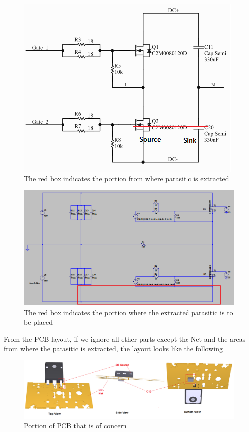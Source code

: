 \begin{figure} [H]
  \centering
  \includegraphics[width=\linewidth]{pictures/examples/schematic2.png}
  \caption{The red box indicates the portion from where parasitic is extracted}
  \label{fig:schematic2}
\end{figure}

\begin{figure} [H]
  \centering
  \includegraphics[width=\linewidth]{pictures/examples/spice3.png}
  \caption{The red box indicates the portion where the extracted parasitic is to be placed}
  \label{fig:spice3}
\end{figure}

From the PCB layout, if we ignore all other parts except the Net and the areas from where the parasitic is extracted, the layout looks like the following

\begin{figure} [H]
  \centering
  \includegraphics[width=\linewidth]{pictures/examples/PCB_cut2.png}
  \caption{Portion of PCB that is of concern}
  \label{fig:PCB_cut2}
\end{figure}

